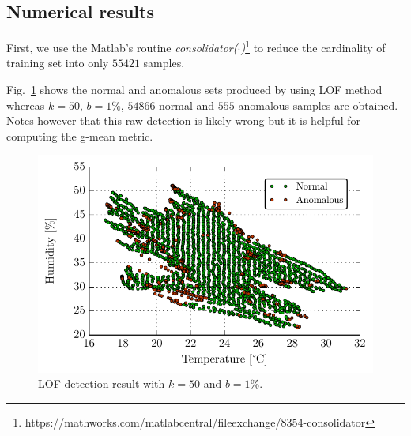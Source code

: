 \documentclass[conference]{IEEEtran}
\theoremstyle{problemstyle}
\begin{document}
\subsection{Numerical results}

First, we use the Matlab's routine \emph{consolidator($\cdot$)}\footnote{https://mathworks.com/matlabcentral/fileexchange/8354-consolidator} to reduce the cardinality of training set into only $55421$ samples.

Fig.~\ref{fig:lof} shows the normal and anomalous sets produced by using  LOF method whereas $k = 50 \text{, } b = 1 \%$, $54866$ normal and $555$ anomalous samples are obtained. Notes however that this raw detection is likely wrong but it is helpful for computing the g-mean metric.  
\begin{figure}[H]
\centering
\includegraphics[scale=.6]{Figs/lof.pdf}
\caption{LOF detection result with $k = 50$ and $b = 1 \%$.}
\label{fig:lof}
\end{figure}
\end{document}
